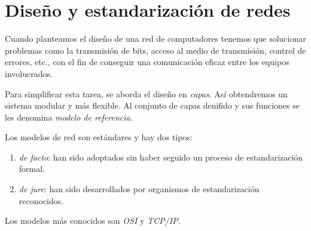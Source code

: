 \documentclass[10pt,a4paper,spanish]{report}
\begin{document}


\section{\textcolor{tema1}Diseño y estandarización de redes}

Cuando planteamos el diseño de una red de computadores tenemos que solucionar problemas como la transmisión de bits, acceso al medio de transmisión, control de errores, etc., con el fin de conseguir una comunicación eficaz entre los equipos involucrados.

Para simplificar esta tarea, se aborda el diseño en \textit{\textcolor{tema1}{capas}}. Así obtendremos un sistema modular y más flexible. Al conjunto de capas denifido y sus funciones se les denomina \textit{\textcolor{tema1}{modelo de referencia}}. 

Los modelos de red son estándares y hay dos tipos:
\begin{enumerate}[\color{tema1}{$\triangle$}]
  \item \textit{\textcolor{tema1}{de facto}}: han sido adoptados sin haber seguido un proceso de estandarización formal.
  \item \textit{\textcolor{tema1}{de jure}}: han sido desarrollados por organismos de estandarización reconocidos.
\end{enumerate}

Los modelos más conocidos son \textit{\textcolor{tema1}{OSI}} y \textit{\textcolor{tema1}{TCP/IP}}.

\begin{center}

\label{estandar}
\end{center}
\end{document}
